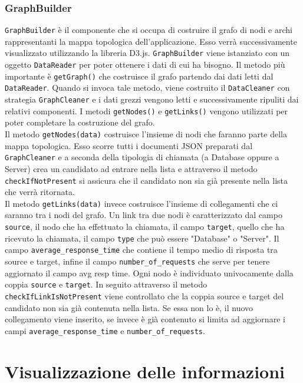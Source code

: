 \subsubsection{GraphBuilder}
\label{sec:GraphBuilder}
	\texttt{GraphBuilder} è il componente che si occupa di costruire il grafo di nodi e archi rappresentanti la mappa topologica dell'applicazione. Esso verrà successivamente visualizzato utilizzando la libreria D3.js. \texttt{GraphBuilder} viene istanziato con un oggetto \texttt{DataReader} per poter ottenere i dati di cui ha bisogno. Il metodo più importante è \texttt{getGraph()} che costruisce il grafo partendo dai dati letti dal \texttt{DataReader}. Quando si invoca tale metodo, viene costruito il \texttt{DataCleaner} con strategia \texttt{GraphCleaner} e i dati grezzi vengono letti e successivamente ripuliti dai relativi componenti.
	I metodi \texttt{getNodes()} e \texttt{getLinks()} vengono utilizzati per poter completare la costruzione del grafo.\\
	Il metodo \texttt{getNodes(data)} costruisce l'insieme di nodi che faranno parte della mappa topologica. Esso scorre tutti i documenti JSON preparati dal \texttt{GraphCleaner} e a seconda della tipologia di chiamata (a Database oppure a Server) crea un candidato ad entrare nella lista e attraverso il metodo \texttt{checkIfNotPresent} si assicura che il candidato non sia già presente nella lista che verrà ritornata.\\
	Il metodo \texttt{getLinks(data)} invece costruisce l'insieme di collegamenti che ci saranno tra i nodi del grafo. Un link tra due nodi è caratterizzato dal campo \texttt{source}, il nodo che ha effettuato la chiamata, il campo \texttt{target}, quello che ha ricevuto la chiamata, il campo \texttt{type} che può essere "Database" o "Server". Il campo \texttt{average\_response\_time} che contiene il tempo medio di risposta tra source e target, infine il campo \texttt{number\_of\_requests} che serve per tenere aggiornato il campo avg resp time. Ogni nodo è individuato univocamente dalla coppia \texttt{source} e \texttt{target}.
	In seguito attraverso il metodo \texttt{checkIfLinkIsNotPresent} viene controllato che la coppia source e target del candidato non sia già contenuta nella lista. Se essa non lo è, il nuovo collegamento viene inserito, se invece è già contenuto si limita ad aggiornare i campi \texttt{average\_response\_time} e \texttt{number\_of\_requests}. 

\section{Visualizzazione delle informazioni}

